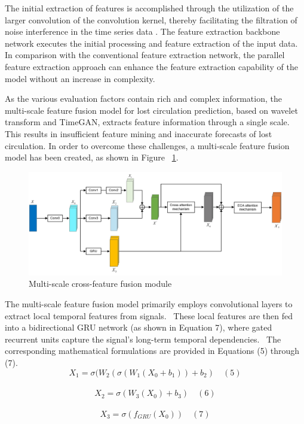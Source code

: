 \documentclass[journal,article,submit,pdftex,moreauthors]{Definitions/mdpi}
\begin{document}
The initial extraction of features is accomplished through the utilization of the larger convolution of the convolution kernel, thereby facilitating the filtration of noise interference in the time series data \cite{meizhou2024}. The feature extraction backbone network executes the initial processing and feature extraction of the input data. In comparison with the conventional feature extraction network, the parallel feature extraction approach can enhance the feature extraction capability of the model without an increase in complexity\cite{lishutao2018}.

As the various evaluation factors contain rich and complex information, the multi-scale feature fusion model for lost circulation prediction, based on wavelet transform and TimeGAN, extracts feature information through a single scale. This results in insufficient feature mining and inaccurate forecasts of lost circulation. In order to overcome these challenges, a multi-scale feature fusion model has been created, as shown in Figure ~\ref{fig:Multi-scale cross-feature fusion module}.

\begin{figure}[H]
    \centering
    \includegraphics[width=1\linewidth,height=0.28\textheight]{图片/多尺度特征注意力.png}
    \caption{Multi-scale cross-feature fusion module}
    \label{fig:Multi-scale cross-feature fusion module}
\end{figure}


The multi-scale feature fusion model primarily employs convolutional layers to extract local temporal features from signals.  These local features are then fed into a bidirectional GRU network (as shown in Equation 7), where gated recurrent units capture the signal's long-term temporal dependencies.  The corresponding mathematical formulations are provided in Equations (5) through (7).
\[{{X}_{1}}=\sigma ({{W}_{2}}(\sigma ({{W}_{1}}({{X}_{0}}+{{b}_{1}}))+{{b}_{2}})\quad (5)\]
    \[{{X}_{2}}=\sigma ({{W}_{3}}({{X}_{0}})+{{b}_{3}})\quad (6)\]
    \[{{X}_{3}}=\sigma ({{f}_{GRU}}({{X}_{0}}))\quad (7)\]
\end{document}
